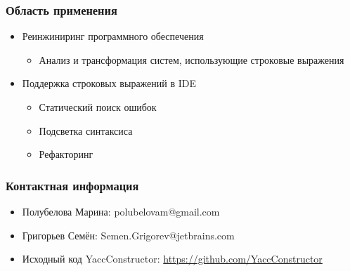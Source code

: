 \documentclass{beamer}
\begin{document}
\begin{frame}
\transwipe[direction=90]
\frametitle{Область применения}
\begin{itemize}
\item Реинжиниринг программного обеспечения
	\begin{itemize}
	\item Анализ и трансформация систем, использующие строковые выражения
	\end{itemize}
\item Поддержка строковых выражений в IDE
	\begin{itemize}
    \item Статический поиск ошибок
	\item Подсветка синтаксиса
	\item Рефакторинг
	\end{itemize}
\end{itemize}
\end{frame}

\begin{frame}
\transwipe[direction=90]
\frametitle{Контактная информация}
\begin{itemize}
\item Полубелова Марина: polubelovam@gmail.com
\item Григорьев Семён: Semen.Grigorev@jetbrains.com
\item Исходный код YaccConstructor:
\href{https://github.com/YaccConstructor}{https://github.com/YaccConstructor}
\end{itemize}
\end{frame}
\end{document}
